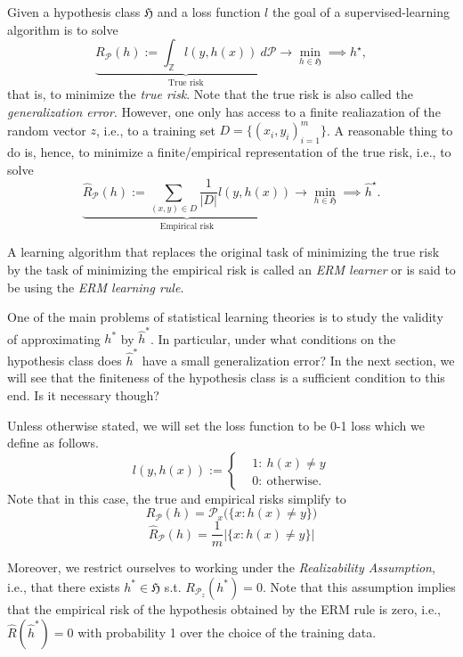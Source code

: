 Given a hypothesis class $\mathfrak{H}$  and a loss function $l$ the goal of a supervised-learning
algorithm is to solve 
\begin{equation*}
    \underbrace{R_{\mathcal{P}}(h) := \int_{\mathbb{Z}} l(y, h(x)) \ d \mathcal{P}}_{\text{True risk}} \longrightarrow \min_{h \in \mathfrak{H}} \implies h^\star, 
\end{equation*}
that is, to minimize the \emph{true risk}. Note that the true risk is also called the
\emph{generalization error}. However, one only has access to a finite
realiazation of the random vector $z$, i.e., to a training set $D=\{(x_i,
y_i)_{i=1}^m\}$. A reasonable thing to do is, hence, to minimize a
finite/empirical representation of the true risk, i.e., to solve
\begin{equation*}
    \underbrace{\hat{R}_{\mathcal{P}} (h) := \sum_{(x,y) \in D} \frac{1}{|D|}l(y, h(x)) }_{\text{Empirical risk}} \longrightarrow \min_{h \in \mathfrak{H}} \implies \hat{h}^\star.
\end{equation*}

A learning algorithm that replaces the original task of minimizing the true risk
by the task of minimizing the empirical risk is called an \emph{ERM learner} or
is said to be using the \emph{ERM learning rule}. 

One of the main problems of statistical learning theories is to study the
validity of approximating $h^*$ by $\hat{h}^*$. In particular, under what
conditions on the hypothesis class does $\hat{h}^*$ have a small generalization error?
In the next section, we will see that the finiteness of the hypothesis class is
a sufficient condition to this end. Is it necessary though?

Unless otherwise stated, we will set the loss function to be 0-1 loss which we define as follows.
\begin{equation*}
    l(y, h(x)) :=
    \begin{cases}
         & 1: \ h(x) \neq y \\
        & 0: \ \text{otherwise}.
    \end{cases}	
\end{equation*}
Note that in this case, the true and empirical risks simplify to
$$
R_{\mathcal{P}}(h) = \mathcal{P}_x \bigl(\{x: h(x) \neq y\} \bigr)
$$
$$
\hat{R}_{\mathcal{P}}(h) = \frac{1}{m} | \{x: h(x) \neq y\} |
$$

Moreover, we restrict ourselves to working under the  
 \emph{Realizability Assumption}, i.e., that
there exists $h^* \in \mathfrak{H}$ s.t. $R_{\mathcal{P}_z}(h^*) = 0$. Note that
this assumption implies that the empirical risk of the hypothesis obtained by
the ERM rule is zero, i.e., $\hat{R}(\hat{h}^*) = 0$ with probability 1 over the
choice of the training data.

